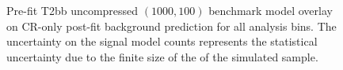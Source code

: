 \begin{figure}[!h]
{        \label{fig:T2bb_uncompressed_MR_4j}
    } \\
     ~~
     \\
    \caption{
        Pre-fit T2bb uncompressed $(1000,100)$ benchmark model overlay on
        CR-only post-fit background prediction for all analysis bins. The
        uncertainty on the signal model counts represents the statistical
        uncertainty due to the finite size of the of the simulated sample.
    }
    \label{fig:T2bb_uncompressed_MR}
\end{figure}


